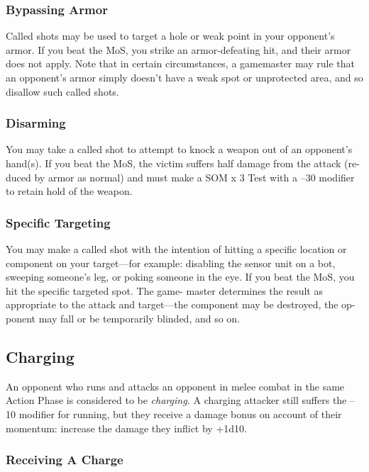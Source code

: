\subsubsection{Bypassing Armor}

Called shots may be used to target a hole or weak 
point in your opponent's armor. If you beat the MoS, 
you strike an armor-defeating hit, and their armor 
does not apply. Note that in certain circumstances, a 
gamemaster may rule that an opponent's armor simply 
doesn't have a weak spot or unprotected area, and so 
disallow such called shots.

\subsubsection{Disarming}

You may take a called shot to attempt to knock a 
weapon out of an opponent's hand(s). If you beat the 
MoS, the victim suffers half damage from the attack (re-
duced by armor as normal) and must make a SOM x 3 
Test with a –30 modifier to retain hold of the weapon.

\subsubsection{Specific Targeting}

You may make a called shot with the intention of hitting 
a specific location or component on your target—for 
example: disabling the sensor unit on a bot, sweeping 
someone's leg, or poking someone in the eye. If you beat 
the MoS, you hit the specific targeted spot. The game-
master determines the result as appropriate to the attack 
and target—the component may be destroyed, the op-
ponent may fall or be temporarily blinded, and so on.

\subsection{Charging}

An opponent who runs and attacks an opponent in 
melee combat in the same Action Phase is considered 
to be \textit{charging.} A charging attacker still suffers the 
–10 modifier for running, but they receive a damage 
bonus on account of their momentum: increase the 
damage they inflict by +1d10.

\subsubsection{Receiving A Charge}

